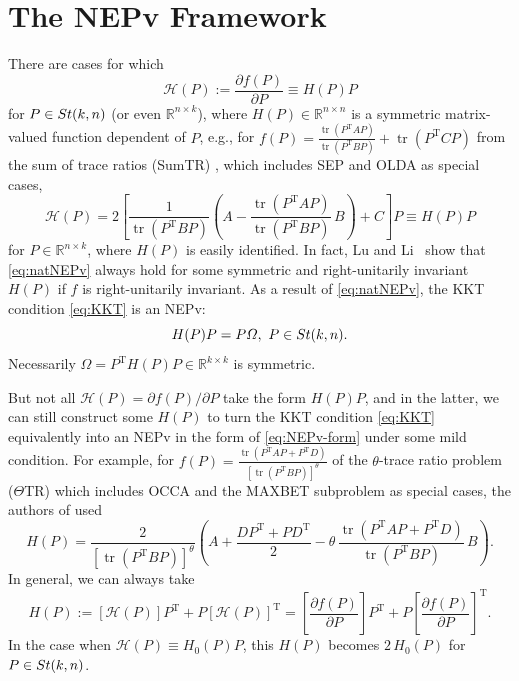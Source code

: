 \documentclass[11pt]{article}
\def\bbR{\mathbb{R}}
\def\scrH{\mathscr{H}}
\newcommand\STM[2]{{\rm St}(#1,#2)}
\newcommand\STMnbr{{\rm St}_{\delta}(k,n)}
\DeclareMathOperator{\tr}{tr}
\DeclareMathOperator{\T}{T}
\def\Blue{\textcolor{blue}}
\theoremstyle{definition}
\numberwithin{equation}{section}
\begin{document}
\section{The NEPv Framework}\label{sec:NEPv-theory}
There are cases for which
\begin{equation}\label{eq:natNEPv}
\scrH(P):=\frac{\partial f(P)}{\partial P}\equiv H(P)P
\end{equation}
for $P\in\STM{k}{n}$ (or even $\bbR^{n\times k}$), where $H(P)\in\bbR^{n\times n}$ is a symmetric matrix-valued function
dependent of $P$, e.g., for
$f(P)=\frac {\tr(P^{\T}AP)}{\tr(P^{\T}BP)}+\tr(P^{\T}CP)$ from the sum of trace ratios (SumTR) \cite{zhli:2014a,zhli:2014b},
which includes SEP and OLDA as special cases,
\begin{equation}\label{eq:H(p):sumTR}
\scrH(P)=2\left[\frac 1{\tr(P^{\T}BP)}\left(A-\frac {\tr(P^{\T}AP)}{\tr(P^{\T}BP)}\, B\right)+C\right]P\equiv H(P)P
\end{equation}
for $P\in\bbR^{n\times k}$, where $H(P)$ is easily identified.
In fact, Lu and Li~\cite[Lemma 2.1]{luli:2024} show that
\eqref{eq:natNEPv} always hold for some symmetric and right-unitarily invariant $H(P)$ if $f$ is right-unitarily invariant.
As a result of \eqref{eq:natNEPv}, the KKT condition \eqref{eq:KKT} is an NEPv:
\begin{equation}\label{eq:NEPv-form}
H(P)P=P\Omega, \,\, P\in\STM{k}{n}.
\end{equation}
Necessarily $\Omega=P^{\T}H(P)P\in\bbR^{k\times k}$ is symmetric.

But not all $\scrH(P)={\partial f(P)}/{\partial P}$ take the form $H(P)P$, and in the latter,
we can still construct some $H(P)$ to turn the KKT condition \eqref{eq:KKT} equivalently into an NEPv in the form of
\eqref{eq:NEPv-form} under some mild condition.
For example, for
$f(P)=\frac {\tr(P^{\T}AP+P^{\T}D)}{[\tr(P^{\T}BP)]^{\theta}}$
of the $\theta$-trace ratio problem ($\Theta$TR)
which includes OCCA and the MAXBET subproblem as special cases,
the authors of \cite{wazl:2023} used
\begin{equation}\label{eq:H(P):theta-TR}
H(P)=\frac 2{[\tr(P^{\T}BP)]^{\theta}}
     \left(A+\frac {DP^{\T}+PD^{\T}}2-\theta\,\frac {\tr(P^{\T}AP+P^{\T}D)}{\tr(P^{\T}BP)}\,B\right).
\end{equation}
In general, we can always take
\begin{equation}\label{eq:H(P):always}
H(P):=[\scrH(P)]P^{\T}+P[\scrH(P)]^{\T}=\left[\frac{\partial f(P)}{\partial P}\right] P^{\T}+P\left[\frac{\partial f(P)}{\partial P}\right]^{\T}.
\end{equation}
In the case when $\scrH(P)\equiv H_0(P)P$, this $H(P)$ becomes $2\,H_0(P)$ for $P\in\STM{k}{n}$.
\end{document}
